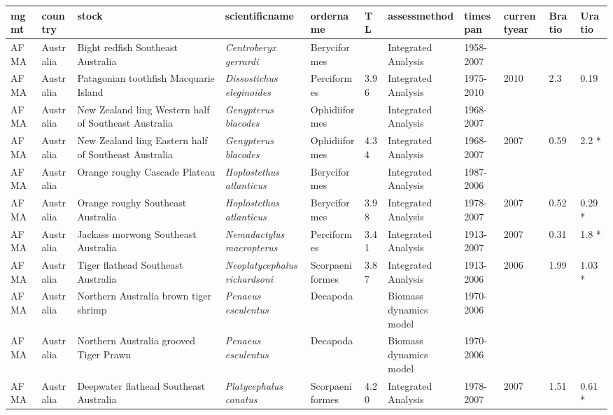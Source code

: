\begin{longtable}{p{1.5cm}p{1.5cm}p{3cm}p{3cm}p{2.5cm}p{0.9cm}p{1.4cm}p{0.9cm}p{0.9cm}p{0.9cm}p{1cm}}
  \hline
mgmt & country & stock & scientificname & ordername & TL & assessmethod & timespan & currentyear & Bratio & Uratio \\ 
  \hline
AFMA & Australia & Bight redfish Southeast Australia & \textit{Centroberyx gerrardi} & Beryciformes &  & Integrated Analysis & 1958-2007 &  &  &  \\ 
  AFMA & Australia & Patagonian toothfish Macquarie Island & \textit{Dissostichus eleginoides} & Perciformes & 3.96 & Integrated Analysis & 1975-2010 & 2010 & 2.3 & 0.19 \\ 
  AFMA & Australia & New Zealand ling Western half of Southeast Australia & \textit{Genypterus blacodes} & Ophidiiformes &  & Integrated Analysis & 1968-2007 &  &  &  \\ 
  AFMA & Australia & New Zealand ling Eastern half of Southeast Australia & \textit{Genypterus blacodes} & Ophidiiformes & 4.34 & Integrated Analysis & 1968-2007 & 2007 & 0.59 & 2.2 * \\ 
  AFMA & Australia & Orange roughy Cascade Plateau & \textit{Hoplostethus atlanticus} & Beryciformes &  & Integrated Analysis & 1987-2006 &  &  &  \\ 
  AFMA & Australia & Orange roughy Southeast Australia & \textit{Hoplostethus atlanticus} & Beryciformes & 3.98 & Integrated Analysis & 1978-2007 & 2007 & 0.52 & 0.29 * \\ 
  AFMA & Australia & Jackass morwong Southeast Australia & \textit{Nemadactylus macropterus} & Perciformes & 3.41 & Integrated Analysis & 1913-2007 & 2007 & 0.31 & 1.8 * \\ 
  AFMA & Australia & Tiger flathead Southeast Australia & \textit{Neoplatycephalus richardsoni} & Scorpaeniformes & 3.87 & Integrated Analysis & 1913-2006 & 2006 & 1.99 & 1.03 * \\ 
  AFMA & Australia & Northern Australia brown tiger shrimp & \textit{Penaeus esculentus} & Decapoda &  & Biomass dynamics model & 1970-2006 &  &  &  \\ 
  AFMA & Australia & Northern Australia grooved Tiger Prawn & \textit{Penaeus esculentus} & Decapoda &  & Biomass dynamics model & 1970-2006 &  &  &  \\ 
  AFMA & Australia & Deepwater flathead Southeast Australia & \textit{Platycephalus conatus} & Scorpaeniformes & 4.20 & Integrated Analysis & 1978-2007 & 2007 & 1.51 & 0.61 * \\ 

\end{longtable}
